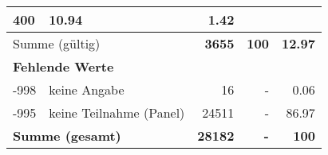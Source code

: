 \begin{longtable}{lXrrr}
       \num{400} &
       \num[round-mode=places,round-precision=2]{10.94} &
         \num[round-mode=places,round-precision=2]{1.42} \\
     \midrule
     \multicolumn{2}{l}{Summe (gültig)} &
       \textbf{\num{3655}} &
     \textbf{\num{100}} &
       \textbf{\num[round-mode=places,round-precision=2]{12.97}} \\
     \multicolumn{5}{l}{\textbf{Fehlende Werte}}\\
       -998 &
       keine Angabe &
         \num{16} &
        - &
         \num[round-mode=places,round-precision=2]{0.06} \\
       -995 &
       keine Teilnahme (Panel) &
         \num{24511} &
        - &
         \num[round-mode=places,round-precision=2]{86.97} \\
     \midrule
     \multicolumn{2}{l}{\textbf{Summe (gesamt)}} &
          \textbf{\num{28182}} &
        \textbf{-} &
        \textbf{\num{100}} \\
     \bottomrule
     \end{longtable}
     

